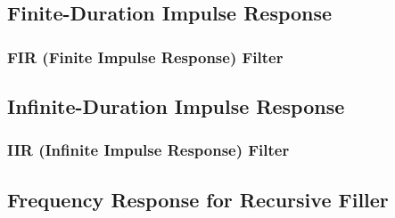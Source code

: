 \subsection{Finite-Duration Impulse Response}
\subsubsection{FIR (Finite Impulse Response) Filter}
\subsection{Infinite-Duration Impulse Response}
\subsubsection{IIR (Infinite Impulse Response) Filter}
\subsection{Frequency Response for Recursive Filler}

